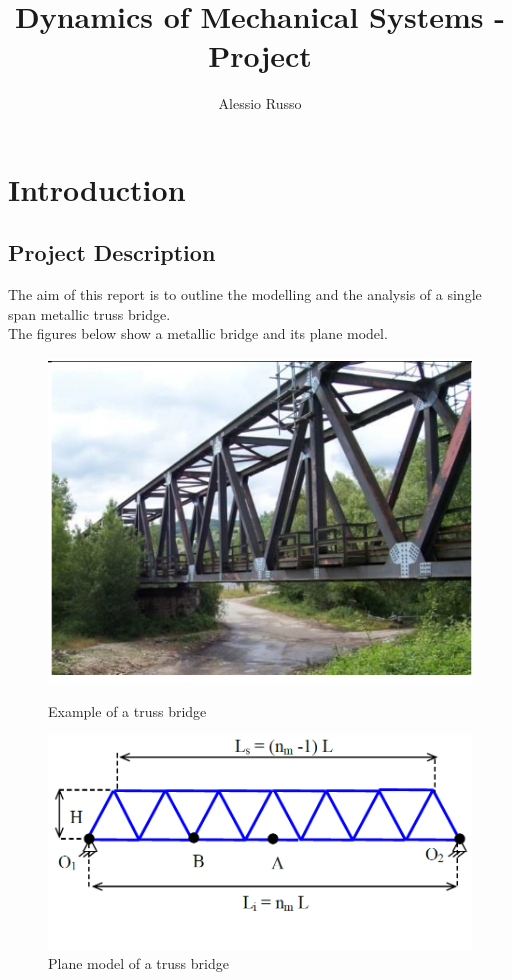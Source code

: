 \documentclass[10pt,a4paper,final]{report}
\author{Alessio Russo}
\title{Dynamics of Mechanical Systems - Project}
\begin{document}
\maketitle
\tableofcontents
\newpage
\section{Introduction}
\subsection{Project Description}
The aim of this report is to outline the modelling and the analysis of a single span metallic truss bridge.
\\
The figures below show a metallic bridge and its plane model.
\\
\begin{figure}[h]
\centering
\includegraphics[scale=0.8]{bridge_sample1}
\label{fig:bridge1}
\caption{Example of a truss bridge}
\end{figure}
\begin{figure}[!]
\includegraphics[width=1\textwidth]{bridge_model1}
\caption{Plane model of a truss bridge}
\label{fig:bridge2}
\centering
\end{figure}
\newpage
\end{document}
